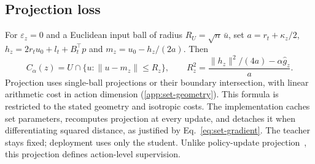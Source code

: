 \subsection{Projection loss}
For $\varepsilon_z=0$ and a Euclidean input ball of radius
$R_U=\sqrt n\,\bar u$, set $a=r_t+\kappa_z/2$,
$h_z=2r_tu_0+l_t+B_t^\top p$ and $m_z=u_0-h_z/(2a)$. Then
\begin{equation}
 C_\alpha(z)=U\cap\{u:\|u-m_z\|\leq R_z\},\qquad
 R_z^2=\frac{\|h_z\|^2/(4a)-\alpha\widehat g_z}{a}.
\end{equation}
Projection uses single-ball projections or their boundary intersection,
with linear arithmetic cost in action dimension (\ref{app:set-geometry}).
This formula is restricted to the stated geometry and isotropic costs.
The implementation caches set parameters, recomputes projection at every
update, and detaches it when differentiating squared distance, as justified
by Eq.~\eqref{eq:set-gradient}. The teacher stays fixed; deployment uses
only the student. Unlike policy-update projection~\cite{yang2020pcpo},
this projection defines action-level supervision.

